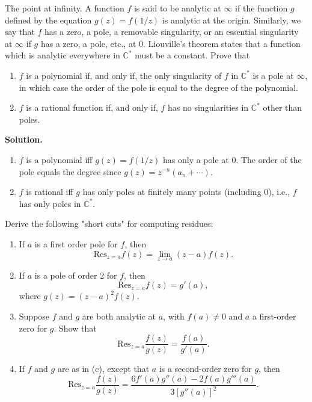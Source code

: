 \begin{problembox}
The point at infinity. A function \( f \) is said to be analytic at \( \infty \) if the function \( g \) defined by the equation \( g(z) = f(1/z) \) is analytic at the origin. Similarly, we say that \( f \) has a zero, a pole, a removable singularity, or an essential singularity at \( \infty \) if \( g \) has a zero, a pole, etc., at 0. Liouville's theorem states that a function which is analytic everywhere in \( \mathbb{C}^* \) must be a constant. Prove that
\begin{enumerate}[label=(\alph*)]
\item \( f \) is a polynomial if, and only if, the only singularity of \( f \) in \( \mathbb{C}^* \) is a pole at \( \infty \), in which case the order of the pole is equal to the degree of the polynomial.
\item \( f \) is a rational function if, and only if, \( f \) has no singularities in \( \mathbb{C}^* \) other than poles.
\end{enumerate}
\end{problembox}

\noindent\textbf{Solution.}
\begin{enumerate}[label=(\alph*)]
\item $f$ is a polynomial iff $g(z)=f(1/z)$ has only a pole at $0$. The order of the pole equals the degree since $g(z)=z^{-n}(a_n+\cdots)$.
\item $f$ is rational iff $g$ has only poles at finitely many points (including $0$), i.e., $f$ has only poles in $\mathbb C^*$.
\end{enumerate}

\begin{problembox}
Derive the following "short cuts" for computing residues:
\begin{enumerate}[label=(\alph*)]
\item If \( a \) is a first order pole for \( f \), then
\[ \text{Res}_{z=a} f(z) = \lim_{z \to a} (z - a) f(z). \]
\item If \( a \) is a pole of order 2 for \( f \), then
\[ \text{Res}_{z=a} f(z) = g'(a), \]
where \( g(z) = (z - a)^2 f(z) \).
\item Suppose \( f \) and \( g \) are both analytic at \( a \), with \( f(a) \neq 0 \) and \( a \) a first-order zero for \( g \). Show that
\[ \text{Res}_{z=a} \frac{f(z)}{g(z)} = \frac{f(a)}{g'(a)}. \]
\item If \( f \) and \( g \) are as in (c), except that \( a \) is a second-order zero for \( g \), then
\[ \text{Res}_{z=a} \frac{f(z)}{g(z)} = \frac{6 f'(a) g''(a) - 2 f(a) g'''(a)}{3 [g''(a)]^2}. \]
\end{enumerate}
\end{problembox}

